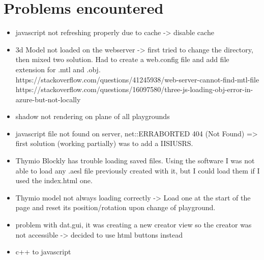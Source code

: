 \documentclass{scrreprt}
\begin{document}
\chapter{Problems encountered}
\begin{itemize}
  \item javascript not refreshing properly due to cache -> disable cache
  \item 3d Model not loaded on the webserver -> first tried to change the directory, then mixed two solution. 
        Had to create a web.config file and add file extension for .mtl and .obj.
        https://stackoverflow.com/questions/41245938/web-server-cannot-find-mtl-file
        https://stackoverflow.com/questions/16097580/three-js-loading-obj-error-in-azure-but-not-locally
  \item shadow not rendering on plane of all playgrounds
  \item javascript file not found on server, net::ERR\textunderscore ABORTED 404 (Not Found) => first solution (working partially) was to add a IIS\textunderscore IUSRS.
  \item Thymio Blockly has trouble loading saved files. Using the software I was not able to load any .aesl file previously created with it, but I could load them if I used the index.html one.
  \item Thymio model not always loading correctly -> Load one at the start of the page and reset its position/rotation upon change of playground.
  \item problem with dat.gui, it was creating a new creator view so the creator was not accessible -> decided to use html buttons instead
  \item c++ to javascript
\end{itemize}
\end{document}
